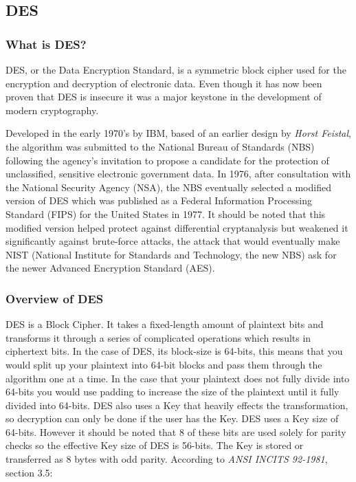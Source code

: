 \subsection{DES}
\subsubsection{What is DES?}

DES, or the Data Encryption Standard, is a symmetric block cipher used for the encryption and decryption of electronic data. Even though it has now been proven that DES is insecure it was a major keystone in the development of modern cryptography. 

Developed in the early 1970's by IBM, based of an earlier design by \textit{Horst Feistal}, the algorithm was submitted to the National Bureau of Standards (NBS) following the agency's invitation to propose a candidate for the protection of unclassified, sensitive electronic government data. In 1976, after consultation with the National Security Agency (NSA), the NBS eventually selected a modified version of DES which was published as a Federal Information Processing Standard (FIPS) for the United States in 1977. It should be noted that this modified version helped protect against differential cryptanalysis but weakened it significantly against brute-force attacks, the attack that would eventually make NIST (National Institute for Standards and Technology, the new NBS) ask for the newer Advanced Encryption Standard (AES).

\subsubsection{Overview of DES}

DES is a Block Cipher. It takes a fixed-length amount of plaintext bits and transforms it through a series of complicated operations which results in ciphertext bits. In the case of DES, its block-size is 64-bits, this means that you would split up your plaintext into 64-bit blocks and pass them through the algorithm one at a time. In the case that your plaintext does not fully divide into 64-bits you would use padding to increase the size of the plaintext until it fully divided into 64-bits. DES also uses a Key that heavily effects the transformation, so decryption can only be done if the user has the Key. DES uses a Key size of 64-bits. However it should be noted that 8 of these bits are used solely for parity checks so the effective Key size of DES is 56-bits. The Key is stored or transferred as 8 bytes with odd parity. According to \textit{ANSI INCITS 92-1981}, section 3.5:

